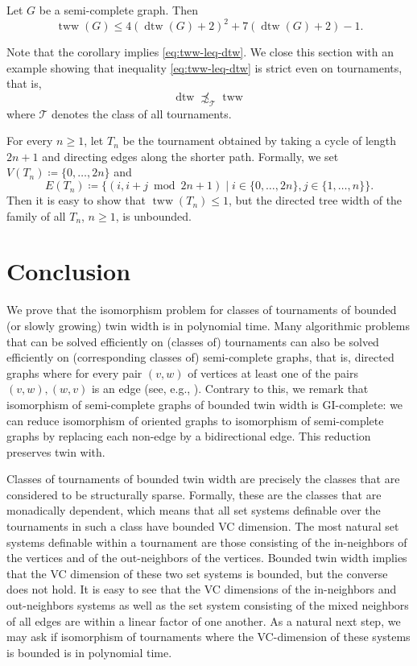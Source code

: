 \documentclass{theoretics}
\newcommand{\CT}{{\mathcal T}}
\newcommand{\bigmid}{\;\big|\;}
\DeclareMathOperator{\dtw}{dtw}
\DeclareMathOperator{\tww}{tww}
\begin{document}
\begin{corollary}
 \label{cor:tww-vs-dtw}
 Let $G$ be a semi-complete graph.
 Then
 \[\tww(G) \leq 4(\dtw(G) + 2)^2 + 7(\dtw(G) + 2) - 1.\]
\end{corollary}

Note that the corollary implies \eqref{eq:tww-leq-dtw}.
We close this section with an example showing that inequality \eqref{eq:tww-leq-dtw} is strict even on tournaments, that is,
\[\dtw\not\precsim_{\CT}\tww\]
where $\CT$ denotes the class of all tournaments.

\begin{example}
 For every $n \geq 1$, let $T_n$ be the tournament obtained by taking a cycle of length $2n+1$ and directing edges along the shorter path.
 Formally, we set $V(T_n) \coloneqq \{0,\dots,2n\}$ and
 \[E(T_n) \coloneqq \big\{ (i,i+j \bmod{2n+1}) \bigmid i \in \{0,\dots,2n\}, j \in \{1,\dots,n\}\big\}.\]
 Then it is easy to show that $\tww(T_n) \leq 1$, but the directed tree width of the family of all $T_n$, $n \geq 1$, is unbounded.
\end{example}


\section{Conclusion}

We prove that the isomorphism problem for classes of tournaments of bounded (or slowly growing) twin width is in polynomial time.
Many algorithmic problems that can be solved efficiently on (classes of) tournaments can also be solved efficiently on (corresponding classes of) semi-complete graphs, that is, directed graphs where for every pair $(v,w)$ of vertices at least one of the pairs $(v,w),(w,v)$ is an edge (see, e.g., \cite{Pilipczuk13}).
Contrary to this, we remark that isomorphism of semi-complete graphs of bounded twin width is GI-complete:
we can reduce isomorphism of oriented graphs to isomorphism of semi-complete graphs by replacing each non-edge by a bidirectional edge.
This reduction preserves twin with.

Classes of tournaments of bounded twin width are precisely the classes that are considered to be structurally sparse.
Formally, these are the classes that are monadically dependent, which means that all set systems definable over the tournaments in such a class have bounded VC dimension.
The most natural set systems definable within a tournament are those consisting of the in-neighbors of the vertices and of the out-neighbors of the vertices.
Bounded twin width implies that the VC dimension of these two set systems is bounded, but the converse does not hold.
It is easy to see that the VC dimensions of the in-neighbors and out-neighbors systems as well as the set system consisting of the mixed neighbors of all edges are within a linear factor of one another.
As a natural next step, we may ask if isomorphism of tournaments where the VC-dimension of these systems is bounded is in polynomial time.


\printbibliography
\end{document}
